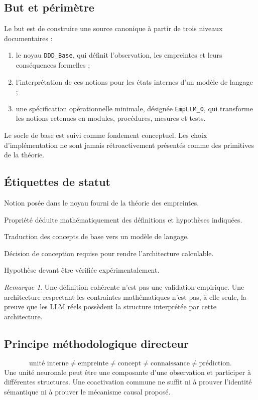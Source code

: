 \documentclass[11pt,a4paper]{article}
\theoremstyle{remark}
\newtheorem{remark}[definition]{Remarque}
\begin{document}
\subsection{But et périmètre}
Le but est de construire une source canonique à partir de trois niveaux documentaires :
\begin{enumerate}[label=\arabic*.]
  \item le noyau \texttt{DDD\_Base}, qui définit l'observation, les empreintes et leurs conséquences formelles ;
  \item l'interprétation de ces notions pour les états internes d'un modèle de langage ;
  \item une spécification opérationnelle minimale, désignée \texttt{EmpLLM\_0}, qui transforme les notions retenues en modules, procédures, mesures et tests.
\end{enumerate}
Le socle de base est suivi comme fondement conceptuel. Les choix d'implémentation ne sont jamais rétroactivement présentés comme des primitives de la théorie.

\subsection{Étiquettes de statut}
\begin{description}[style=nextline,leftmargin=2.2cm]
  \item[\textbf{[BASE]}] Notion posée dans le noyau fourni de la théorie des empreintes.
  \item[\textbf{[DÉRIVÉ]}] Propriété déduite mathématiquement des définitions et hypothèses indiquées.
  \item[\textbf{[APPLICATION]}] Traduction des concepts de base vers un modèle de langage.
  \item[\textbf{[INGÉNIERIE]}] Décision de conception requise pour rendre l'architecture calculable.
  \item[\textbf{[EMPIRIQUE]}] Hypothèse devant être vérifiée expérimentalement.
\end{description}

\begin{remark}
Une définition cohérente n'est pas une validation empirique. Une architecture respectant les contraintes mathématiques n'est pas, à elle seule, la preuve que les LLM réels possèdent la structure interprétée par cette architecture.
\end{remark}

\subsection{Principe méthodologique directeur}
\[
\boxed{\text{unité interne}\ne\text{empreinte}\ne\text{concept}\ne\text{connaissance}\ne\text{prédiction}.}
\]
Une unité neuronale peut être une composante d'une observation et participer à différentes structures. Une coactivation commune ne suffit ni à prouver l'identité sémantique ni à prouver le mécanisme causal proposé.
\end{document}
